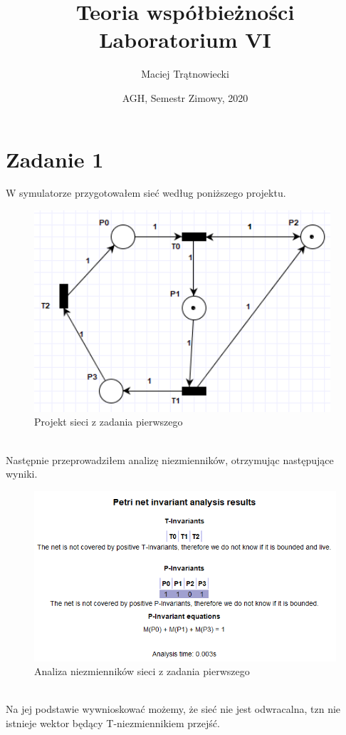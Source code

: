 \documentclass{article}
\title{Teoria współbieżności\\ 
Laboratorium VI}
\author{Maciej Trątnowiecki}
\date{AGH, Semestr Zimowy, 2020}
\begin{document}
    \maketitle
    \section{Zadanie 1}
        W symulatorze przygotowałem sieć według poniższego projektu.
        \begin{figure}[h!]
            \centering
            \includegraphics[width=11cm]{lab6/n1.png}
            \caption{Projekt sieci z zadania pierwszego}
        \end{figure}\\
        Następnie przeprowadziłem analizę niezmienników, otrzymując następujące wyniki.
        \begin{figure}[h!]
            \centering
            \includegraphics[width=14cm]{lab6/n1_1.png}
            \caption{Analiza niezmienników sieci z zadania pierwszego}
        \end{figure}\\
        Na jej podstawie wywnioskować możemy, że sieć nie jest odwracalna, tzn nie istnieje wektor będący T-niezmiennikiem przejść. 
\end{document}
